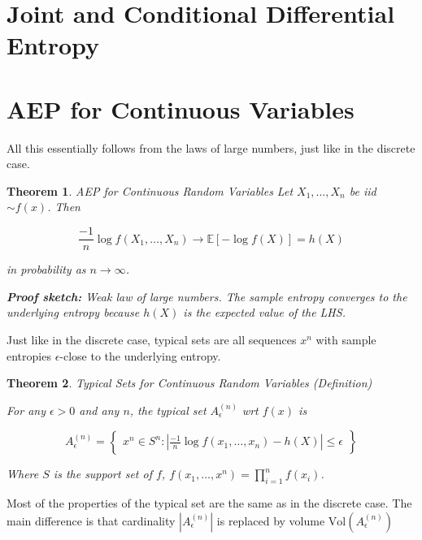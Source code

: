 \documentclass[a4paper,12pt]{report}
\newtheorem{theorem}{Theorem}
\begin{document}
\section{Joint and Conditional Differential Entropy}








\section{AEP for Continuous Variables}

All this essentially follows from the laws of large numbers, just like in the
discrete case. 

\begin{theorem}{AEP for Continuous Random Variables}
Let $X_1, \dots, X_n$ be iid $\sim f(x)$. Then 

\begin{equation}
	\frac{-1}{n} \log f(X_1, \dots, X_n) \to \mathbb E[-\log f(X)] = h(X)
\end{equation}

in probability as $n\to \infty$.

\textbf{Proof sketch:} Weak law of large numbers. The sample entropy converges
to the underlying entropy because $h(X)$ is the expected value of the LHS.
\end{theorem}



Just like in the discrete case, typical sets are all sequences $x^n$ with sample
entropies $\epsilon$-close to the underlying entropy.


\begin{theorem}{Typical Sets for Continuous Random Variables (Definition)}

For any $\epsilon > 0$ and any $n$, the typical set $A_\epsilon^{(n)}$ wrt
$f(x)$ is 

\begin{equation}
	A_\epsilon^{(n)} = \begin{Bmatrix}
		x^n \in S^n : \left|  
			\frac {-1} n \log f(x_1, \dots, x_n) - h(X) 
		\right|
		\leq \epsilon
	\end{Bmatrix}
\end{equation}

Where $S$ is the support set of $f$, $f(x_1, \dots, x^n) = \prod_{i=1}^n
f(x_i)$.
\end{theorem}

Most of the properties of the typical set are the same as in the discrete case.
The main difference is that cardinality $\left| A_\epsilon^{(n)} \right|$ is
replaced by volume $\text{Vol} \left( A_\epsilon ^{(n)} \right)$
\end{document}
